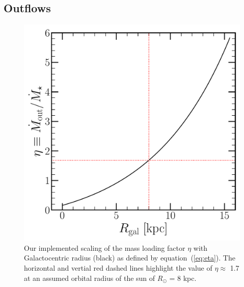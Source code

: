 \documentclass[a4paper, fleqn, usenatbib, useAMS]{mnras}
\newcommand{\refp}[1]{(\ref{#1})}
\begin{document}
\subsection{Outflows} 
\label{sec:methods:outflows} 

\begin{figure} 
\centering 
\includegraphics[scale = 0.45]{eta.pdf} 
\caption{Our implemented scaling of the mass loading factor $\eta$ with 
Galactocentric radius (black) as defined by equation~\refp{eq:eta}. The 
horizontal and vertial red dashed lines highlight the value of $\eta \approx$ 
1.7 at an assumed orbital radius of the sun of $R_\odot$ = 8 kpc. } 
\label{fig:eta} 
\end{figure} 
\end{document}
